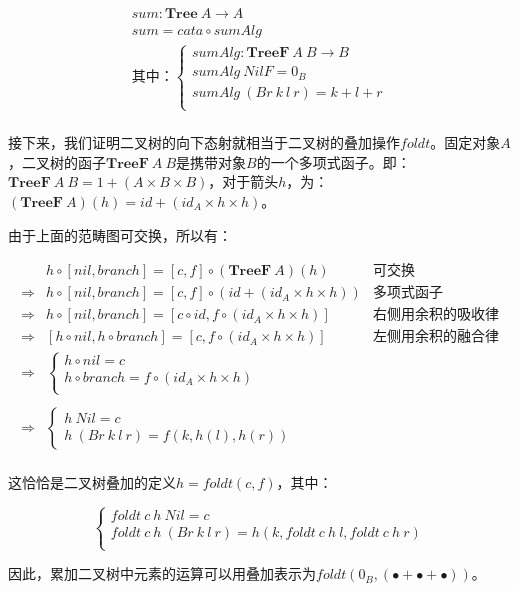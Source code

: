 \documentclass{article}
\begin{document}
\begin{example}
\[
\begin{array}{l}
sum : \mathbf{Tree}\ A \to A \\
sum = cata \circ sumAlg \\
\text{其中：}
      \begin{cases}
        sumAlg : \mathbf{TreeF}\ A\ B \to B \\
        sumAlg\ NilF = 0_{B} \\
        sumAlg\ (Br\ k\ l\ r) = k + l + r \\
      \end{cases} \\
\end{array}
\]

接下来，我们证明二叉树的向下态射就相当于二叉树的叠加操作$foldt$。固定对象$A$，二叉树的函子$\mathbf{TreeF}\ A\ B$是携带对象$B$的一个多项式函子。即：$\mathbf{TreeF}\ A\ B = 1 + (A \times B \times B)$，对于箭头$h$，为：$(\mathbf{TreeF}\ A)(h) = id + (id_A \times h \times h)$。

由于上面的范畴图可交换，所以有：

\[
\begin{array}{rll}
            & h \circ [nil, branch] = [c, f] \circ (\mathbf{TreeF}\ A)(h) & \text{可交换} \\
\Rightarrow & h \circ [nil, branch] = [c, f] \circ (id + (id_A \times h \times h)) & \text{多项式函子} \\
\Rightarrow & h \circ [nil, branch] = [c \circ id, f \circ (id_A \times h \times h)] & \text{右侧用余积的吸收律} \\
\Rightarrow & [h \circ nil, h \circ branch] = [c, f \circ (id_A \times h \times h)] & \text{左侧用余积的融合律} \\
\Rightarrow &
  \begin{cases}
    h \circ nil = c \\
    h \circ branch = f \circ (id_A \times h \times h) \\
  \end{cases} & \\
\\
\Rightarrow &
  \begin{cases}
    h\ Nil = c \\
    h\ (Br\ k\ l\ r) = f(k, h(l), h(r))
  \end{cases} & \\
\end{array}
\]

这恰恰是二叉树叠加的定义$h = foldt(c, f)$，其中：

\[
\begin{cases}
foldt\ c\ h\ Nil = c \\
foldt\ c\ h\ (Br\ k\ l\ r) = h(k, foldt\ c\ h\ l, foldt\ c\ h\ r) \\
\end{cases}
\]

因此，累加二叉树中元素的运算可以用叠加表示为$foldt(0_B, (\bullet + \bullet + \bullet))$。
\end{example}
\end{document}
